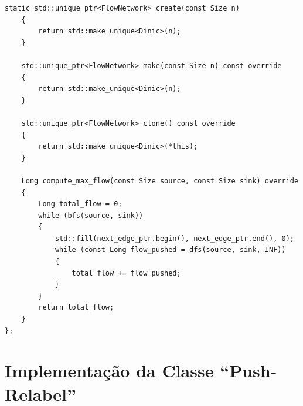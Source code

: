 \documentclass[12pt,a4paper]{article}
\begin{document}
\begin{lstlisting}[caption={Implementação em C++ da classe \lstinline{Dinic}, estruturada com Digrafo de Níveis e otimização de ponteiros mortos no cálculo do fluxo bloqueador.}, label={lst:dinic}]
	static std::unique_ptr<FlowNetwork> create(const Size n)
	{
		return std::make_unique<Dinic>(n);
	}

	std::unique_ptr<FlowNetwork> make(const Size n) const override
	{
		return std::make_unique<Dinic>(n);
	}

	std::unique_ptr<FlowNetwork> clone() const override
	{
		return std::make_unique<Dinic>(*this);
	}

	Long compute_max_flow(const Size source, const Size sink) override
	{
		Long total_flow = 0;
		while (bfs(source, sink))
		{
			std::fill(next_edge_ptr.begin(), next_edge_ptr.end(), 0);
			while (const Long flow_pushed = dfs(source, sink, INF))
			{
				total_flow += flow_pushed;
			}
		}
		return total_flow;
	}
};
\end{lstlisting}
\newpage
\section{Implementação da Classe ``Push-Relabel''}
\label{ap:push_relabel}
\end{document}
